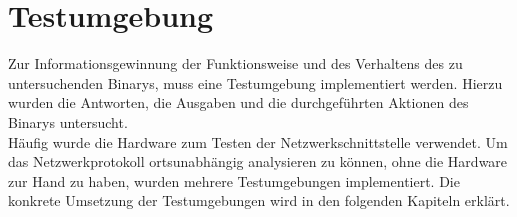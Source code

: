 \section{Testumgebung}\label{sec: testumgebung}
Zur Informationsgewinnung der Funktionsweise und des Verhaltens des zu untersuchenden Binarys, muss eine Testumgebung implementiert werden.
Hierzu wurden die Antworten, die Ausgaben und die durchgeführten Aktionen des Binarys untersucht. \\
Häufig wurde die Hardware zum Testen der Netzwerkschnittstelle verwendet.
Um das Netzwerkprotokoll ortsunabhängig analysieren zu können, ohne die Hardware zur Hand zu haben,
wurden mehrere Testumgebungen implementiert.
Die konkrete Umsetzung der Testumgebungen wird in den folgenden Kapiteln erklärt.



